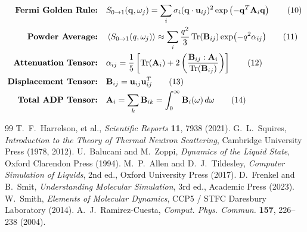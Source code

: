 \documentclass[11pt,a4paper]{article}
\theoremstyle{definition}
\begin{document}
\begin{tcolorbox}[colback=white,colframe=blue!40!black,title=\textbf{Summary of Equations}]
\begin{align}
\text{\textbf{Fermi Golden Rule:}} \quad & S_{0 \to 1}(\mathbf{q}, \omega_j) = \sum_i \sigma_i (\mathbf{q} \cdot \mathbf{u}_{ij})^2 \exp\left( -\mathbf{q}^T \mathbf{A}_i \mathbf{q} \right) \tag{10} \\
\text{\textbf{Powder Average:}} \quad & \ev{S_{0 \to 1}(q, \omega_j)} \approx \sum_i \frac{q^2}{3} \Tr(\mathbf{B}_{ij}) \exp(-q^2 \alpha_{ij}) \tag{11} \\
\text{\textbf{Attenuation Tensor:}} \quad & \alpha_{ij} = \frac{1}{5} \left[ \Tr(\mathbf{A}_i) + 2 \left( \frac{\mathbf{B}_{ij} : \mathbf{A}_i}{\Tr(\mathbf{B}_{ij})} \right) \right] \tag{12} \\
\text{\textbf{Displacement Tensor:}} \quad & \mathbf{B}_{ij} = \mathbf{u}_{ij} \mathbf{u}_{ij}^T \tag{13} \\
\text{\textbf{Total ADP Tensor:}} \quad & \mathbf{A}_i = \sum_k \mathbf{B}_{ik} = \int_0^\infty \mathbf{B}_i(\omega) \, d\omega \tag{14}
\end{align}
\end{tcolorbox}

\begin{thebibliography}{99}
 T.~F.~Harrelson, et al., \emph{Scientific Reports} \textbf{11}, 7938 (2021).
 G.~L.~Squires, \emph{Introduction to the Theory of Thermal Neutron Scattering}, Cambridge University Press (1978, 2012).
 U.~Balucani and M.~Zoppi, \emph{Dynamics of the Liquid State}, Oxford Clarendon Press (1994).
 M.~P.~Allen and D.~J.~Tildesley, \emph{Computer Simulation of Liquids}, 2nd ed., Oxford University Press (2017).
 D.~Frenkel and B.~Smit, \emph{Understanding Molecular Simulation}, 3rd ed., Academic Press (2023).
 W.~Smith, \emph{Elements of Molecular Dynamics}, CCP5 / STFC Daresbury Laboratory (2014).
 A.~J.~Ramirez-Cuesta, \emph{Comput. Phys. Commun.} \textbf{157}, 226--238 (2004).
\end{thebibliography}
\end{document}

